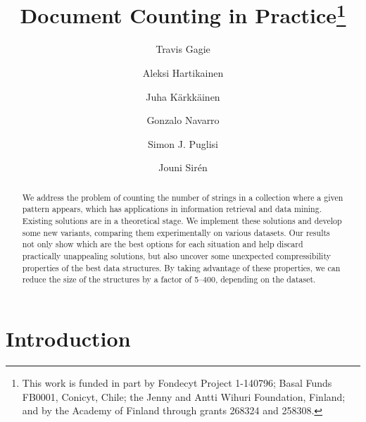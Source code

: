 \documentclass[11pt]{llncs}
\begin{document}
\title{Document Counting in Practice\thanks{This work is funded in part by Fondecyt Project 1-140796; 
Basal Funds FB0001, Conicyt, Chile; the Jenny and Antti Wihuri Foundation, Finland; and by 
the Academy of Finland through grants 268324 and 258308.}}

\author{
Travis Gagie
\and
Aleksi Hartikainen
\and
Juha K{\"a}rkk{\"a}inen
\and
Gonzalo Navarro
\and
Simon J. Puglisi
\and
Jouni Sir\'en
}


\date{}

\maketitle \thispagestyle{empty}
\setcounter{page}{0}

\begin{abstract}
We address the problem of counting the number of strings in a collection where
a given pattern appears, which has applications in information retrieval and
data mining. Existing solutions are in a theoretical stage. We implement
these solutions and develop some new variants, comparing them experimentally on
various datasets. Our results not only show which are the best options for 
each situation and help discard practically unappealing solutions, but 
also uncover some unexpected compressibility properties of the best data 
structures. By taking advantage of these properties, we can reduce the size of
the structures by a factor of 5--400, depending on the dataset.
\end{abstract}

\newpage

\section{Introduction}
\end{document}
